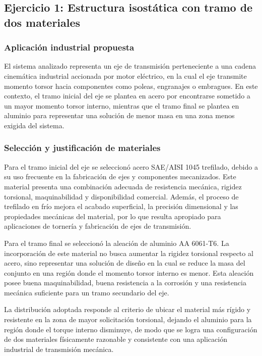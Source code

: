 \documentclass[12pt,a4paper]{article}
\begin{document}
\subsection{Ejercicio 1: Estructura isostática con tramo de dos materiales}

\subsubsection{Aplicación industrial propuesta}
El sistema analizado representa un eje de transmisión perteneciente a una cadena cinemática industrial accionada por motor eléctrico, en la cual el eje transmite momento torsor hacia componentes como poleas, engranajes o embragues. En este contexto, el tramo inicial del eje se plantea en acero por encontrarse sometido a un mayor momento torsor interno, mientras que el tramo final se plantea en aluminio para representar una solución de menor masa en una zona menos exigida del sistema.

\subsubsection{Selección y justificación de materiales}
Para el tramo inicial del eje se seleccionó acero SAE/AISI 1045 trefilado, debido a su uso frecuente en la fabricación de ejes y componentes mecanizados. Este material presenta una combinación adecuada de resistencia mecánica, rigidez torsional, maquinabilidad y disponibilidad comercial. Además, el proceso de trefilado en frío mejora el acabado superficial, la precisión dimensional y las propiedades mecánicas del material, por lo que resulta apropiado para aplicaciones de tornería y fabricación de ejes de transmisión.

Para el tramo final se seleccionó la aleación de aluminio AA 6061-T6. La incorporación de este material no busca aumentar la rigidez torsional respecto al acero, sino representar una solución de diseño en la cual se reduce la masa del conjunto en una región donde el momento torsor interno es menor. Esta aleación posee buena maquinabilidad, buena resistencia a la corrosión y una resistencia mecánica suficiente para un tramo secundario del eje.

La distribución adoptada responde al criterio de ubicar el material más rígido y resistente en la zona de mayor solicitación torsional, dejando el aluminio para la región donde el torque interno disminuye, de modo que se logra una configuración de dos materiales físicamente razonable y consistente con una aplicación industrial de transmisión mecánica.
\end{document}
